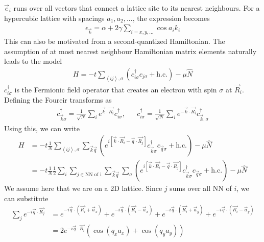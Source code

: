 \documentclass[12pt]{article}
\numberwithin{equation}{section}
\begin{document}
\(\vec e_i\) runs over all vectors that connect a lattice site to its nearest neighbours. For a hypercubic lattice with spacings \(a_1, a_2, ...\), the expression becomes
\begin{equation}\begin{aligned}
	\epsilon_{\vec k} = \alpha + 2\gamma\sum_{i=x,y,...}\cos a_i k_i
\end{aligned}\end{equation}
This can also be motivated from a second-quantized Hamiltonian. The assumption of at most nearest neighbour Hamiltonian matrix elements naturally leads to the model
\begin{equation}\begin{aligned}
	H = -t\sum_{\left<ij\right>, \sigma}\left(c^\dagger_{i \sigma}c_{j\sigma} + \text{h.c.}\right) - \mu \hat N
\end{aligned}\end{equation}
\(c^\dagger_{i\sigma}\) is the Fermionic field operator that creates an electron with spin \(\sigma\) at \(\vec R_i\). Defining the Foureir transforms as
\begin{equation}\begin{aligned}
	c^\dagger_{\vec k\sigma} = \frac{1}{\sqrt N}\sum_{i}e^{\vec{k}\cdot\vec{R_i}}c^\dagger_{i\sigma}, && c^\dagger_{i\sigma} = \frac{1}{\sqrt N}\sum_{i}e^{-\vec{k}\cdot\vec{R_i}}c^\dagger_{\vec k, \sigma}
\end{aligned}\end{equation}
Using this, we can write
\begin{equation}\begin{aligned}
	H &= -t \frac{1}{N} \sum_{\left<ij\right>, \sigma}\sum_{\vec k \vec q}\left(e^{i\left[\vec{k}\cdot\vec{ R_i} - \vec{q}\cdot\vec{ R_j}\right]}c^\dagger_{\vec k \sigma}c_{ \vec q\sigma} + \text{h.c.}\right) - \mu \hat N\\
	  &= -t \frac{1}{N} \frac{1}{2}\sum_{i}\sum_{j \in \text{NN of i}}\sum_{\vec k \vec q}\sum_\sigma\left(e^{i\left[\vec{k}\cdot\vec{ R_i} - \vec{q}\cdot\vec{ R_j}\right]}c^\dagger_{\vec k \sigma}c_{ \vec q\sigma} + \text{h.c.}\right) - \mu \hat N
\end{aligned}\end{equation}
We assume here that we are on a 2D lattice. Since $j$ sums over all NN of $i$, we can substitute 
\begin{equation}\begin{aligned}
	\sum_j e^{-i \vec{q}\cdot\vec{R_j}} &= e^{-i \vec{q}\cdot\left(\vec{R_i} + \vec a_x\right)} + e^{-i \vec{q}\cdot\left(\vec{R_i} - \vec a_x\right)} + e^{-i \vec{q}\cdot\left(\vec{R_i} + \vec a_y\right)} + e^{-i \vec{q}\cdot\left(\vec{R_i} - \vec a_y\right)}\\
					    &=2e^{-i \vec{q}\cdot\vec{R_i}}\left(\cos(q_x a_x) + \cos(q_y a_y)\right) 
\end{aligned}\end{equation}
\end{document}
